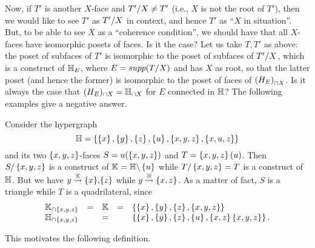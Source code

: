 Now, if $T'$ is another $X$-face and $T'/X\neq T'$ (i.e., $X$ is not the root of $T'$), then we would like to see  $T'$ as $T'/X$ in context, and hence 
$T'$ as ``$X$ in situation''.  But, to be able to see $X$ as a ``coherence condition'', we should have that all $X$-faces have isomorphic posets of faces.  Is it the case?  Let us take $T,T'$ as  above: the poset of subfaces of $T'$ is isomorphic  to the poset of subfaces of $T'/X$, which is a construct of ${\mathbb H}_E$, where $E={supp}(T/X)$ and has $X$ as root, so that the latter poset (and hence the former) is isomorphic to the poset of faces of ${\mathbb (H_E)}_{\cap X}$.
Is it always the case that ${\mathbb (H_E})_{\cap X}={\mathbb H}_{\cap X}$ for $E$ connected in ${\mathbb H}$? The following examples give a negative answer.

\begin{example} \label{non-contextual-1}
Consider the hypergraph 
$${\mathbb H}= \left\{\left\{x\right\},\left\{y\right\},\left\{z\right\},\left\{u\right\},\left\{x,y,z\right\}, \left\{x,u,z\right\}\right\}$$
and its two $\left\{x,y,z\right\}$-faces  $S=u(\left\{x,y,z\right\})$ and $T=\left\{x,y,z\right\}(u)$. Then $S/\left\{x,y,z\right\}$ is a construct of
${\mathbb K}={\mathbb H}\backslash \left\{u\right\}$ while  $T/\left\{x,y,z\right\}=T$  is a construct of ${\mathbb H}$.
But we have $y\stackrel{{\mathbb K}}{\rightsquigarrow}\left\{x\right\}\!,\!\left\{z\right\}$ while  $y\stackrel{{\mathbb H}}{\rightsquigarrow}\left\{x,z\right\}$. As a matter of fact,
$S$ is a triangle while $T$ is a quadrilateral, since
$$\begin{array}{lllll}
{\mathbb K}_{\cap \left\{x,y,z\right\}} &=& {\mathbb K} & = & \left\{\left\{x\right\},\left\{y\right\},\left\{z\right\},\left\{x,y,z\right\}\right\}\\
{\mathbb H}_{\cap \left\{x,y,z\right\}} 	&& =&&  \left\{\left\{x\right\},\left\{y\right\},\left\{z\right\},\left\{u\right\},\left\{x,z\right\}\left\{x,y,z\right\}\right\}.
\end{array}$$
\end{example}



This motivates the following definition.

